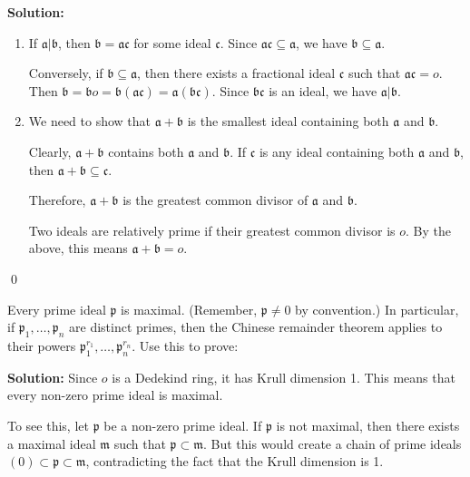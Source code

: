 \noindent\textbf{Solution:}
\begin{enumerate}[label=(\alph*)]
    \item If $\mathfrak{a} | \mathfrak{b}$, then $\mathfrak{b} = \mathfrak{a}\mathfrak{c}$ for some ideal $\mathfrak{c}$. Since $\mathfrak{a}\mathfrak{c} \subseteq \mathfrak{a}$, we have $\mathfrak{b} \subseteq \mathfrak{a}$.
    
    Conversely, if $\mathfrak{b} \subseteq \mathfrak{a}$, then there exists a fractional ideal $\mathfrak{c}$ such that $\mathfrak{a}\mathfrak{c} = o$. Then $\mathfrak{b} = \mathfrak{b}o = \mathfrak{b}(\mathfrak{a}\mathfrak{c}) = \mathfrak{a}(\mathfrak{b}\mathfrak{c})$. Since $\mathfrak{b}\mathfrak{c}$ is an ideal, we have $\mathfrak{a} | \mathfrak{b}$.
    
    \item We need to show that $\mathfrak{a} + \mathfrak{b}$ is the smallest ideal containing both $\mathfrak{a}$ and $\mathfrak{b}$.
    
    Clearly, $\mathfrak{a} + \mathfrak{b}$ contains both $\mathfrak{a}$ and $\mathfrak{b}$. If $\mathfrak{c}$ is any ideal containing both $\mathfrak{a}$ and $\mathfrak{b}$, then $\mathfrak{a} + \mathfrak{b} \subseteq \mathfrak{c}$.
    
    Therefore, $\mathfrak{a} + \mathfrak{b}$ is the greatest common divisor of $\mathfrak{a}$ and $\mathfrak{b}$.
    
    Two ideals are relatively prime if their greatest common divisor is $o$. By the above, this means $\mathfrak{a} + \mathfrak{b} = o$.
\end{enumerate}


\qed
\begin{problembox}
Every prime ideal $\mathfrak{p}$ is maximal. (Remember, $\mathfrak{p} \neq 0$ by convention.) In particular, if $\mathfrak{p}_1, \ldots, \mathfrak{p}_n$ are distinct primes, then the Chinese remainder theorem applies to their powers $\mathfrak{p}_1^{r_1}, \ldots, \mathfrak{p}_n^{r_n}$. Use this to prove:
\end{problembox}

\noindent\textbf{Solution:}
Since $o$ is a Dedekind ring, it has Krull dimension 1. This means that every non-zero prime ideal is maximal.

To see this, let $\mathfrak{p}$ be a non-zero prime ideal. If $\mathfrak{p}$ is not maximal, then there exists a maximal ideal $\mathfrak{m}$ such that $\mathfrak{p} \subset \mathfrak{m}$. But this would create a chain of prime ideals $(0) \subset \mathfrak{p} \subset \mathfrak{m}$, contradicting the fact that the Krull dimension is 1.

